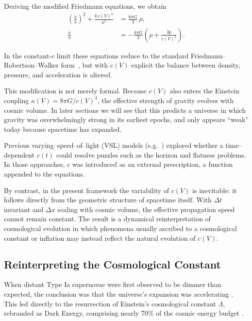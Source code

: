 \documentclass[12pt]{article}
\begin{document}
Deriving the modified Friedmann equations, we obtain
\begin{align}
  \left(\frac{\dot{a}}{a}\right)^2 + \frac{k\, c(V)^2}{a^2} &= \frac{8 \pi G}{3}\,\rho, \\
  \frac{\ddot{a}}{a} &= -\frac{4 \pi G}{3}\!\left( \rho + \frac{3p}{c(V)^2} \right).
\end{align}

In the constant-$c$ limit these equations reduce to the standard Friedmann–Robertson–Walker form~\cite{frw}, but with $c(V)$ explicit the balance between density, pressure, and acceleration is altered.  

This modification is not merely formal. Because $c(V)$ also enters the Einstein coupling $\kappa(V) = 8\pi G / c(V)^4$, the effective strength of gravity evolves with cosmic volume. In later sections we will see that this predicts a universe in which gravity was overwhelmingly strong in its earliest epochs, and only appears ``weak'' today because spacetime has expanded.

Previous varying–speed–of–light (VSL) models (e.g.\ \cite{albrecht1999,barrow1999,magueijo2003}) explored whether a time– dependent \(c(t)\) could resolve puzzles such as the horizon and flatness problems.  In those approaches, \(c\) was introduced as an external prescription, a function appended to the equations.

By contrast, in the present framework the variability of \(c(V)\) is inevitable: it follows directly from the geometric structure of spacetime itself.  With \(\Delta t\) invariant and \(\Delta x\) scaling with cosmic volume, the effective propagation speed cannot remain constant.  The result is a dynamical reinterpretation of cosmological evolution in which phenomena usually ascribed to a cosmological constant or inflation may instead reflect the natural evolution of \(c(V)\).

\subsection{Reinterpreting the Cosmological Constant}

When distant Type Ia supernovae were first observed to be dimmer than expected, the conclusion was that the universe’s expansion was accelerating \citep{perlmutter1999, riess1998}. This led directly to the resurrection of Einstein’s cosmological constant \( \Lambda \), rebranded as Dark Energy, comprising nearly 70\% of the cosmic energy budget \citep{planck2018}.
\end{document}

